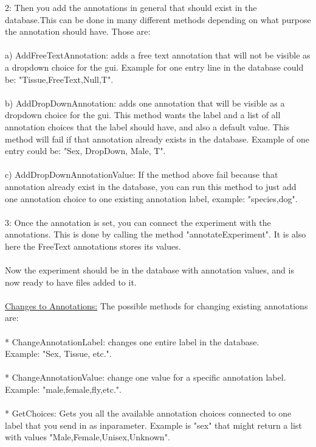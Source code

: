2: Then you add the annotations in general that should exist in the database.This can be done in many different methods depending on what purpose the annotation should have. Those are:\\
\\
a) AddFreeTextAnnotation: adds a free text annotation that will not be visible as a dropdown choice for the gui. Example for one entry line in the database could be: "Tissue,FreeText,Null,T".\\
\\
b) AddDropDownAnnotation: adds one annotation that will be visible as a dropdown choice for the gui. This method wants the label and a list of all annotation choices that the label should have, and also a default value. This method will fail if that annotation already exists in the database. Example of one entry could be: "Sex, DropDown, Male, T".\\
\\
c) AddDropDownAnnotationValue: If the method above fail because that annotation already exist in the database, you can run this method to just add one annotation choice to one existing annotation label, example: "species,dog".\\
\\
3: Once the annotation is set, you can connect the experiment with the annotations. This is done by calling the method "annotateExperiment". It is also here the FreeText annotations stores its values.\\
\\
Now the experiment should be in the database with annotation values, and is now ready to have files added to it.\\
\\
\underline{Changes to Annotations:} The possible methods for changing existing annotations are:\\
\\
* ChangeAnnotationLabel: changes one entire label in the database.\\Example: "Sex, Tissue, etc.".\\
\\
* ChangeAnnotationValue: change one value for a specific annotation label.\\Example: "male,female,fly,etc.".\\
\\
* GetChoices: Gets you all the available annotation choices connected to one label that you send in as inparameter. Example is "sex" that might return a list with values "Male,Female,Unisex,Unknown".\\
